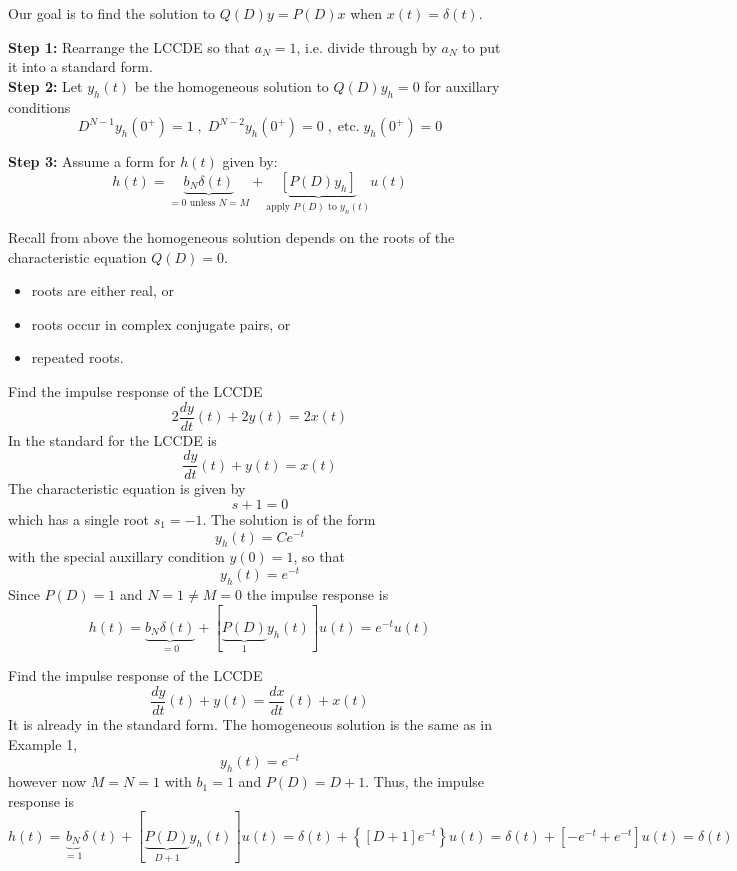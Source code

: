 Our goal is to find the solution to $Q(D)y = P(D)x$ when $x(t)=\delta(t)$.

\noindent\textbf{Step 1:} Rearrange the LCCDE so that $a_N = 1$, i.e. divide through by $a_N$ to put it into a standard form.\\

\noindent\textbf{Step 2:} Let $y_h(t)$ be the homogeneous solution to $Q(D)y_h = 0$ for auxillary conditions
  \[
    D^{N-1}y_h(0^+) = 1 \; , \; D^{N-2}y_h(0^+) = 0 \; , \; \text{etc.} \; y_h(0^+) = 0 
    \]
    
\noindent\textbf{Step 3:} Assume a form for $h(t)$ given by:
  \[
  h(t) = \underbrace{b_N\delta(t)}_{=0 \text{ unless } N=M} + \underbrace{\left[ P(D)y_h\right]}_{\text{apply } P(D) \text{ to } y_n(t)}u(t)
  \]

Recall from above the homogeneous solution depends on the roots of the characteristic equation $Q(D) = 0$.

\begin{itemize}
\item roots are either real, or
\item roots occur in complex conjugate pairs, or
\item repeated roots.
\end{itemize}

\begin{example}
Find the impulse response of the LCCDE
\[
2\frac{dy}{dt}(t) + 2y(t) = 2x(t)
\]
In the standard for the LCCDE is
\[
\frac{dy}{dt}(t) + y(t) = x(t)
\]
The characteristic equation is given by
\[
s + 1 = 0
\]
which has a single root $s_1 = -1$. The solution is of the form
\[
y_h(t) = Ce^{-t} 
\]
with the special auxillary condition $y(0) = 1$, so that
\[
y_h(t) = e^{-t} 
\]
Since $P(D) = 1$ and $N = 1 \neq M = 0$ the impulse response is
\[
h(t) = \underbrace{b_N\delta(t)}_{=0} + \left[ \underbrace{P(D)}_{1}y_h(t)\right]u(t) = e^{-t}u(t)
\]
\end{example}

\begin{example}
Find the impulse response of the LCCDE
\[
\frac{dy}{dt}(t) + y(t) = \frac{dx}{dt}(t) + x(t)
\]
It is already in the standard form. The homogeneous solution is the same as in Example 1,
\[
y_h(t) = e^{-t} 
\]
however now $M = N = 1$ with $b_1 = 1$ and $P(D) = D+1$. Thus, the impulse response is
\[
h(t) = \underbrace{b_N}_{=1}\delta(t) + \left[ \underbrace{P(D)}_{D+1}y_h(t)\right]u(t) = \delta(t) + \left\{[D+1]e^{-t}\right\}u(t) = \delta(t) + [- e^{-t} + e^{-t}]u(t) = \delta(t) 
\]
\end{example}

